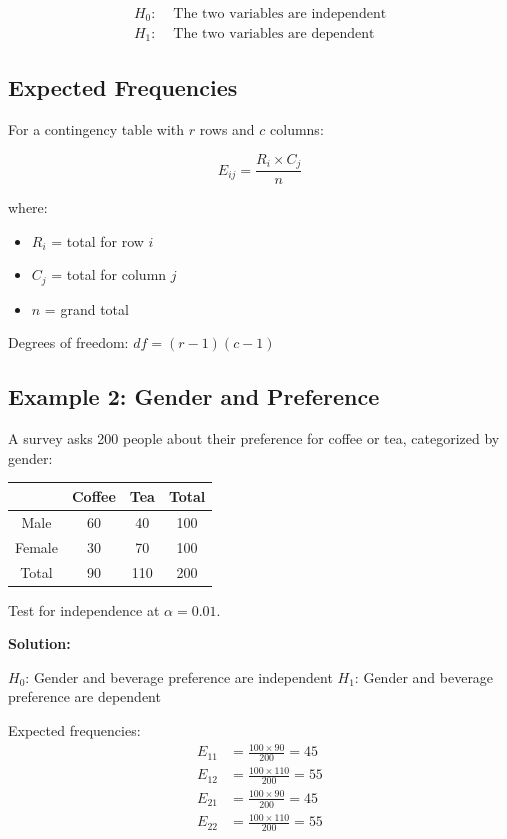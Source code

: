 \documentclass[twoside]{book}
\begin{document}
\begin{align}
H_0: &\text{ The two variables are independent} \\
H_1: &\text{ The two variables are dependent}
\end{align}

\subsection{Expected Frequencies}

For a contingency table with $r$ rows and $c$ columns:

\begin{equation}
E_{ij} = \frac{R_i \times C_j}{n}
\end{equation}

where:
\begin{itemize}
    \item $R_i$ = total for row $i$
    \item $C_j$ = total for column $j$
    \item $n$ = grand total
\end{itemize}

Degrees of freedom: $df = (r-1)(c-1)$

\subsection{Example 2: Gender and Preference}

A survey asks 200 people about their preference for coffee or tea, categorized by gender:

\begin{center}
\begin{tabular}{|c|c|c|c|}
\hline
& Coffee & Tea & Total \\
\hline
Male & 60 & 40 & 100 \\
Female & 30 & 70 & 100 \\
\hline
Total & 90 & 110 & 200 \\
\hline
\end{tabular}
\end{center}

Test for independence at $\alpha = 0.01$.

\textbf{Solution:}

$H_0$: Gender and beverage preference are independent
$H_1$: Gender and beverage preference are dependent

Expected frequencies:
\begin{align}
E_{11} &= \frac{100 \times 90}{200} = 45 \\
E_{12} &= \frac{100 \times 110}{200} = 55 \\
E_{21} &= \frac{100 \times 90}{200} = 45 \\
E_{22} &= \frac{100 \times 110}{200} = 55
\end{align}
\end{document}
